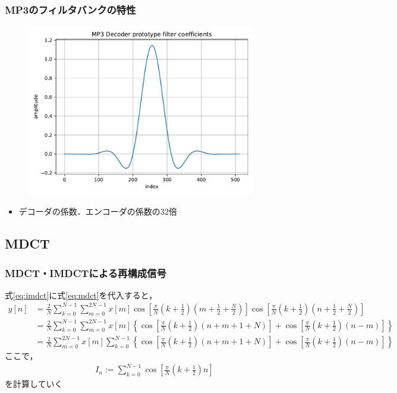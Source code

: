 \documentclass[14pt,xcolor=dvipsnames,table,dvipdfmx]{beamer}
\begin{document}
\begin{frame}[c]
    \frametitle{MP3のフィルタバンクの特性}
    \vspace{-5pt}
    \begin{figure}
        \includegraphics[width=100mm]{./figs/mp3_decoder_prototype_filter_coef.pdf}
    \end{figure}
    \vspace{-5pt}
    \begin{itemize}
        \item デコーダの係数．エンコーダの係数の$32$倍
    \end{itemize}
\end{frame}

\subsection{MDCT} \label{sec:proofs_mdct}

\begin{frame}[c]
    \frametitle{MDCT・IMDCTによる再構成信号}
    式\eqref{eq:imdct}に式\eqref{eq:mdct}を代入すると，
    \scriptsize
    \begin{align*}
        y[n] &= \frac{2}{N} \sum_{k = 0}^{N - 1} \sum_{m = 0}^{2N - 1} x[m] \cos \left[ \frac{\pi}{N} \left( k + \frac{1}{2} \right) \left( m + \frac{1}{2} + \frac{N}{2} \right) \right] \cos \left[ \frac{\pi}{N} \left( k + \frac{1}{2} \right) \left( n + \frac{1}{2} + \frac{N}{2} \right) \right] \\
        &= \frac{2}{N} \sum_{k = 0}^{N - 1} \sum_{m = 0}^{2N - 1} x[m] \left\{ \cos \left[ \frac{\pi}{N} \left( k + \frac{1}{2} \right) \left( n + m + 1 + N \right) \right] + \cos \left[ \frac{\pi}{N} \left( k + \frac{1}{2} \right) \left( n - m \right) \right] \right\} \\
        &= \frac{2}{N} \sum_{m = 0}^{2N - 1} x[m] \sum_{k = 0}^{N - 1} \left\{ \cos \left[ \frac{\pi}{N} \left( k + \frac{1}{2} \right) \left( n + m + 1 + N \right) \right] + \cos \left[ \frac{\pi}{N} \left( k + \frac{1}{2} \right) \left( n - m \right) \right] \right\}
    \end{align*}
    \normalsize
    ここで，
    \begin{align}
        I_{n} := \sum_{k = 0}^{N - 1} \cos \left[ \frac{\pi}{N} \left( k + \frac{1}{2} \right) n \right]
    \end{align}
    を計算していく
\end{frame}
\end{document}
